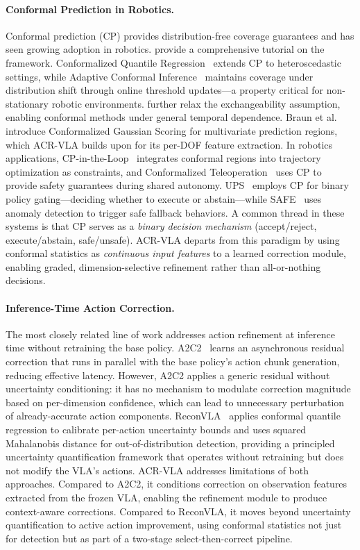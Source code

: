 \paragraph{Conformal Prediction in Robotics.}
Conformal prediction (CP) provides distribution-free coverage guarantees and has seen growing adoption in robotics.
\citet{angelopoulos2023gentle} provide a comprehensive tutorial on the framework.
Conformalized Quantile Regression~\cite{romano2019cqr} extends CP to heteroscedastic settings, while Adaptive Conformal Inference~\cite{gibbs2021aci} maintains coverage under distribution shift through online threshold updates---a property critical for non-stationary robotic environments.
\citet{barber2023conformal} further relax the exchangeability assumption, enabling conformal methods under general temporal dependence.
Braun et al.~\cite{braun2025cgs} introduce Conformalized Gaussian Scoring for multivariate prediction regions, which ACR-VLA builds upon for its per-DOF feature extraction.
In robotics applications, CP-in-the-Loop~\cite{wang2025cploop} integrates conformal regions into trajectory optimization as constraints, and Conformalized Teleoperation~\cite{zhao2024conformalized} uses CP to provide safety guarantees during shared autonomy.
UPS~\cite{yuan2026ups} employs CP for binary policy gating---deciding whether to execute or abstain---while SAFE~\cite{gu2025safe} uses anomaly detection to trigger safe fallback behaviors.
A common thread in these systems is that CP serves as a \emph{binary decision mechanism} (accept/reject, execute/abstain, safe/unsafe).
ACR-VLA departs from this paradigm by using conformal statistics as \emph{continuous input features} to a learned correction module, enabling graded, dimension-selective refinement rather than all-or-nothing decisions.

\paragraph{Inference-Time Action Correction.}
The most closely related line of work addresses action refinement at inference time without retraining the base policy.
A2C2~\cite{a2c2_2025} learns an asynchronous residual correction that runs in parallel with the base policy's action chunk generation, reducing effective latency.
However, A2C2 applies a generic residual without uncertainty conditioning: it has no mechanism to modulate correction magnitude based on per-dimension confidence, which can lead to unnecessary perturbation of already-accurate action components.
ReconVLA~\cite{chen2026reconvla} applies conformal quantile regression to calibrate per-action uncertainty bounds and uses squared Mahalanobis distance for out-of-distribution detection, providing a principled uncertainty quantification framework that operates without retraining but does not modify the VLA's actions.
ACR-VLA addresses limitations of both approaches.
Compared to A2C2, it conditions correction on observation features extracted from the frozen VLA, enabling the refinement module to produce context-aware corrections.
Compared to ReconVLA, it moves beyond uncertainty quantification to active action improvement, using conformal statistics not just for detection but as part of a two-stage select-then-correct pipeline.
